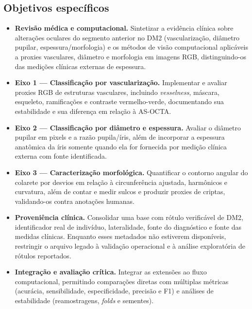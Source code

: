 \documentclass[12pt,a4paper]{article}
\begin{document}
\subsection{Objetivos específicos}
\begin{itemize}
    \item \textbf{Revisão médica e computacional.} Sintetizar a evidência clínica sobre alterações
    oculares do segmento anterior no DM2 (vascularização, diâmetro pupilar, espessura/morfologia) e os
    métodos de visão computacional aplicáveis a proxies vasculares, diâmetro e morfologia em imagens
    RGB, distinguindo-os das medições clínicas externas de espessura.

    \item \textbf{Eixo 1 --- Classificação por vascularização.} Implementar e avaliar proxies RGB de
    estruturas vasculares, incluindo \emph{vesselness}, máscara, esqueleto, ramificações e contraste
    vermelho-verde, documentando sua estabilidade e sua diferença em relação à AS-OCTA.

    \item \textbf{Eixo 2 --- Classificação por diâmetro e espessura.} Avaliar o diâmetro pupilar em
    pixels e a razão pupila/íris, além de incorporar a espessura anatômica da íris somente quando ela
    for fornecida por medição clínica externa com fonte identificada.

    \item \textbf{Eixo 3 --- Caracterização morfológica.} Quantificar o contorno angular do colarete
    por desvios em relação à circunferência ajustada, harmônicos e curvatura, além de contar e medir
    sulcos e produzir proxies de criptas, validando-os contra anotações humanas.

    \item \textbf{Proveniência clínica.} Consolidar uma base com rótulo verificável de DM2,
    identificador real de indivíduo, lateralidade, fonte do diagnóstico e fonte das medidas clínicas.
    Enquanto esses metadados não estiverem disponíveis, restringir o arquivo legado à validação
    operacional e à análise exploratória de rótulos reportados.

    \item \textbf{Integração e avaliação crítica.} Integrar as extensões ao fluxo computacional,
    permitindo comparações diretas com múltiplas métricas (acurácia, sensibilidade,
    especificidade, precisão e F1) e análises de estabilidade (reamostragens, \textit{folds} e
    sementes).
\end{itemize}
\end{document}
